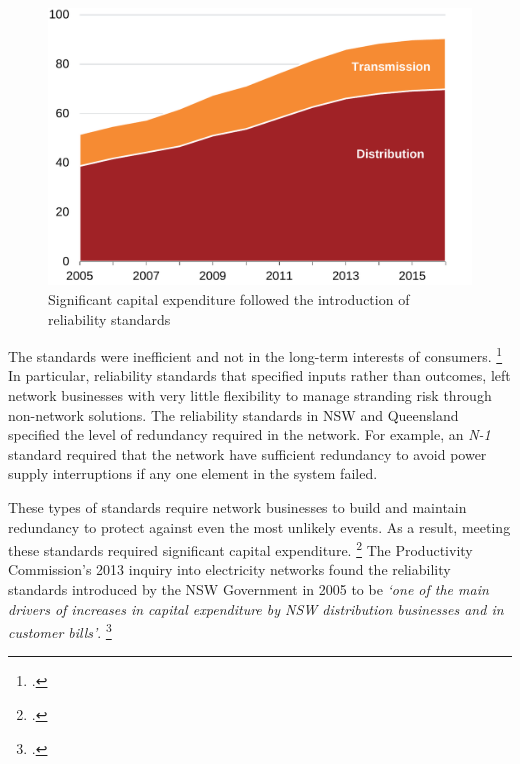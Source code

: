 \documentclass[FrontPage]{grattan}
\begin{document}
\begin{figure}
\caption{Significant capital expenditure followed the introduction of reliability standards}\label{fig:capex-pre-and-post-reliability-standards}
\includegraphics[page=36]{atlas/Charts.pdf}
\end{figure}

The standards were inefficient and not in the long-term interests of consumers.%
\footcite{PC2013ElectricityInquiry}
In particular, reliability standards that specified inputs rather than outcomes, left network businesses with very little flexibility to manage stranding risk through non-network solutions. The reliability standards in NSW and Queensland specified the level of redundancy required in the network. For example, an \emph{N-1} standard required that the network have sufficient redundancy to avoid power supply interruptions if any one element in the system failed. 

These types of standards require network businesses to build and maintain redundancy to protect against even the most unlikely events. As a result, meeting these standards required significant capital expenditure.%
\footcite{BrattleGroup2012SettingReliabilityStandards}
The Productivity Commission's 2013 inquiry into electricity networks found the reliability standards introduced by the NSW Government in 2005 to be \emph{`one of the main drivers of increases in capital expenditure by NSW distribution businesses and in customer bills'}.%
\footcite[][555]{PC2013ElectricityInquiry}
\end{document}
